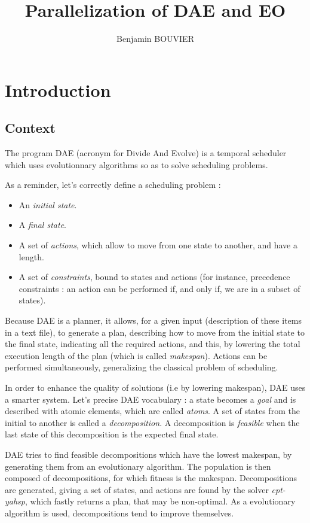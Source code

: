 \documentclass{report}
\title{Parallelization of DAE and EO}
\author{Benjamin BOUVIER}
\begin{document}
\maketitle

\chapter{Introduction}
\section{Context}
The program DAE (acronym for Divide And Evolve) is a temporal scheduler which uses evolutionnary algorithms so as to
solve scheduling problems.

As a reminder, let's correctly define a scheduling problem :
\begin{itemize}
\item An \textit{initial state}.
\item A \textit{final state}.
\item A set of \textit{actions}, which allow to move from one state to another, and have a length.
\item A set of \textit{constraints}, bound to states and actions (for instance, precedence constraints : an action can be
performed if, and only if, we are in a subset of states).
\end{itemize}

Because DAE is a planner, it allows, for a given input (description of these items in a text file), to generate a plan,
describing how to move from the initial state to the final state, indicating all the required actions, and this, by
lowering the total execution length of the plan (which is called \textit{makespan}). Actions can be performed simultaneously,
generalizing the classical problem of scheduling.

In order to enhance the quality of solutions (i.e by lowering makespan), DAE uses a smarter system. Let's precise DAE
vocabulary : a state becomes a \textit{goal} and is described with atomic elements, which are called \textit{atoms}. A set of
states from the initial to another is called a \textit{decomposition}. A decomposition is \textit{feasible} when the
last state of this decomposition is the expected final state.

DAE tries to find feasible decompositions which have the lowest makespan, by generating them from an evolutionary
algorithm. The population is then composed of decompositions, for which fitness is the makespan. Decompositions are generated, giving a set of states, and actions are found
by the solver
\textit{cpt-yahsp}, which fastly returns a plan, that may be non-optimal. As a evolutionary algorithm is used,
decompositions tend to improve themselves.
\end{document}
